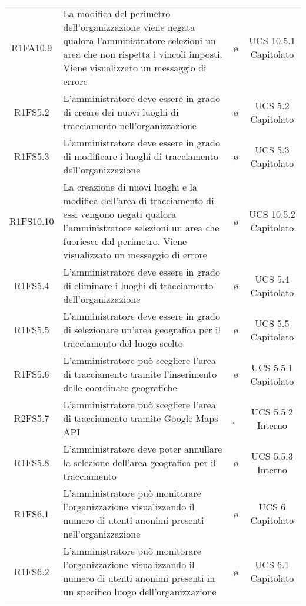 {\begin{longtable}{ c C{8cm} c c}
R1FA10.9 & La modifica del perimetro dell'organizzazione viene negata qualora l'amministratore selezioni un area che non rispetta i vincoli imposti. Viene visualizzato un messaggio di errore & \o & UCS 10.5.1 Capitolato \\

R1FS5.2 & L'amministratore deve essere in grado di creare dei nuovi luoghi di tracciamento nell'organizzazione & \o & UCS 5.2 Capitolato\\

R1FS5.3 & L'amministratore deve essere in grado di modificare i luoghi di tracciamento dell'organizzazione  & \o & UCS 5.3 Capitolato\\

R1FS10.10 & La creazione di nuovi luoghi e la modifica dell'area di tracciamento di essi vengono negati qualora l'amministratore selezioni un area che fuoriesce dal perimetro. Viene visualizzato un messaggio di errore & \o & UCS 10.5.2 Capitolato \\

R1FS5.4 & L'amministratore deve essere in grado di eliminare i luoghi di tracciamento dell'organizzazione  & \o & UCS 5.4 Capitolato\\

R1FS5.5 & L'amministratore deve essere in grado di selezionare un'area geografica per il tracciamento del luogo scelto  & \o & UCS 5.5 Capitolato\\

R1FS5.6 &  L'amministratore può scegliere l'area di tracciamento tramite l'inserimento delle coordinate geografiche & \o & UCS 5.5.1 Capitolato\\

R2FS5.7 & L'amministratore può scegliere l'area di tracciamento tramite Google Maps API & \d & UCS 5.5.2 Interno\\

R1FS5.8 & L'amministratore deve poter annullare la selezione dell'area geografica per il tracciamento& \o & UCS 5.5.3 Interno\\

R1FS6.1 & L'amministratore può monitorare l'organizzazione visualizzando il numero di utenti anonimi presenti nell'organizzazione & \o & UCS 6 Capitolato\\

R1FS6.2 & L'amministratore può monitorare l'organizzazione visualizzando il numero di utenti anonimi presenti in un specifico luogo dell'organizzazione & \o & UCS 6.1 Capitolato\\


\end{longtable}}
